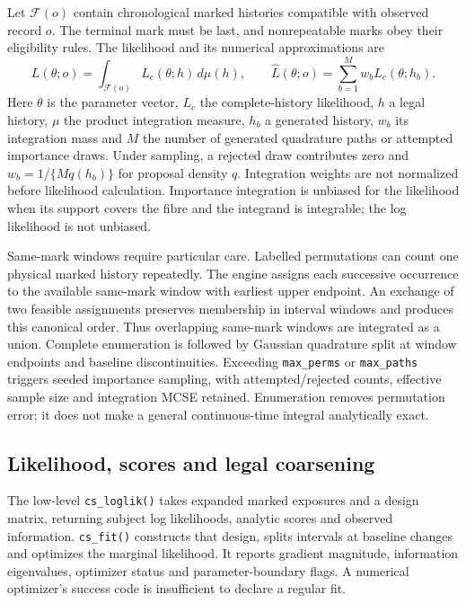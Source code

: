 \documentclass[article,nojss]{jss}
\newcommand{\code}[1]{\texttt{#1}}
\begin{document}
Let $\mathcal F(o)$ contain chronological marked histories compatible with observed record $o$. The terminal mark must be last, and nonrepeatable marks obey their eligibility rules. The likelihood and its numerical approximations are
\begin{equation}\label{eq:fibre}
 L(\theta;o)=\int_{\mathcal F(o)}L_c(\theta;h)\,d\mu(h),\qquad
 \widehat L(\theta;o)=\sum_{b=1}^{M}w_bL_c(\theta;h_b).
\end{equation}
Here $\theta$ is the parameter vector, $L_c$ the complete-history likelihood, $h$ a legal history, $\mu$ the product integration measure, $h_b$ a generated history, $w_b$ its integration mass and $M$ the number of generated quadrature paths or attempted importance draws. Under sampling, a rejected draw contributes zero and $w_b=1/\{M q(h_b)\}$ for proposal density $q$. Integration weights are not normalized before likelihood calculation. Importance integration is unbiased for the likelihood when its support covers the fibre and the integrand is integrable; the log likelihood is not unbiased.

Same-mark windows require particular care. Labelled permutations can count one physical marked history repeatedly. The engine assigns each successive occurrence to the available same-mark window with earliest upper endpoint. An exchange of two feasible assignments preserves membership in interval windows and produces this canonical order. Thus overlapping same-mark windows are integrated as a union. Complete enumeration is followed by Gaussian quadrature split at window endpoints and baseline discontinuities. Exceeding \code{max\_perms} or \code{max\_paths} triggers seeded importance sampling, with attempted/rejected counts, effective sample size and integration MCSE retained. Enumeration removes permutation error; it does not make a general continuous-time integral analytically exact.

\subsection{Likelihood, scores and legal coarsening}
The low-level \code{cs\_loglik()} takes expanded marked exposures and a design matrix, returning subject log likelihoods, analytic scores and observed information. \code{cs\_fit()} constructs that design, splits intervals at baseline changes and optimizes the marginal likelihood. It reports gradient magnitude, information eigenvalues, optimizer status and parameter-boundary flags. A numerical optimizer's success code is insufficient to declare a regular fit.
\end{document}

